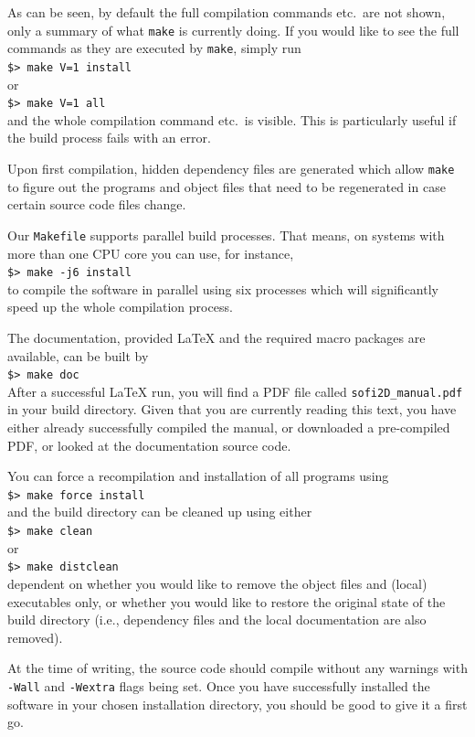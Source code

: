 \documentclass[11pt,english,a4paper]{article}
\newcommand{\RET}{\raisebox{2pt}{\scalebox{0.8}{\Return}}}
\begin{document}
As can be seen, by default the full compilation commands etc.\ are not shown, only a summary of what \texttt{make} is currently doing. If you would like to see the full commands as they are executed by \texttt{make}, simply run\\
\verb+$> make V=1 install+\RET{}\\
or\\
\verb+$> make V=1 all+\RET{}\\
and the whole compilation command etc.\ is visible. This is particularly useful if the build process fails with an error.

Upon first compilation, hidden dependency files are generated which allow \texttt{make} to figure out the programs and object files that need to be regenerated in case certain source code files change.

Our \texttt{Makefile} supports parallel build processes. That means, on systems with more than one CPU core you can use, for instance,\\
\verb+$> make -j6 install+\RET{}\\
to compile the software in parallel using six processes which will significantly speed up the whole compilation process.

The documentation, provided \LaTeX{} and the required macro packages are available, can be built by\\
\verb+$> make doc+\RET{}\\
After a successful \LaTeX{} run, you will find a PDF file called \texttt{sofi2D\_manual.pdf} in your build directory. Given that you are currently reading this text, you have either already successfully compiled the manual, or downloaded a pre-compiled PDF, or looked at the documentation source code.

You can force a recompilation and installation of all programs using\\
\verb+$> make force install+\RET{}\\
and the build directory can be cleaned up using either\\
\verb+$> make clean+\RET{}\\
or\\
\verb+$> make distclean+\RET{}\\
dependent on whether you would like to remove the object files and (local) executables only, or whether you would like to restore the original state of the build directory (i.e., dependency files and the local documentation are also removed).

At the time of writing, the source code should compile without any warnings with \texttt{-Wall} and \texttt{-Wextra} flags being set. Once you have successfully installed the software in your chosen installation directory, you should be good to give it a first go.
\end{document}
